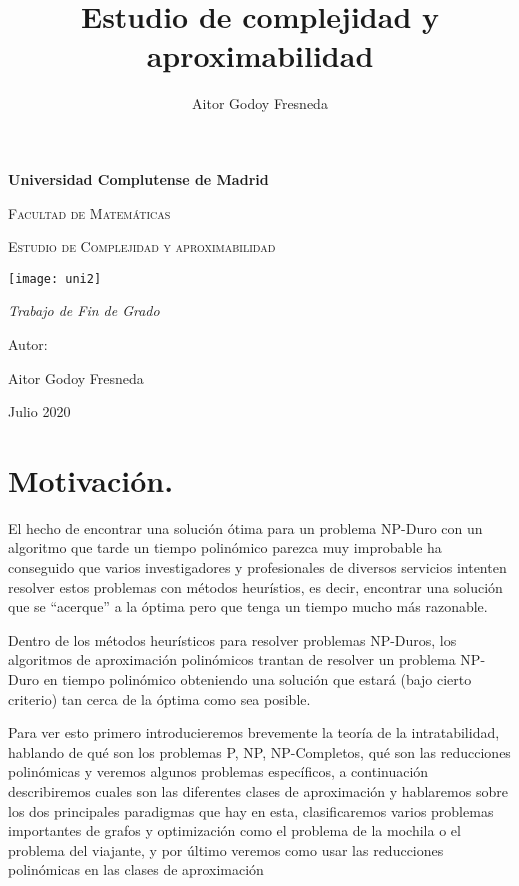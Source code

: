\documentclass[a4paper,12pt,titlepage]{article}
\title{Estudio de complejidad y aproximabilidad}
\author{Aitor Godoy Fresneda}
\begin{document}
\begin{titlepage}
  \centering
  {\bfseries\LARGE Universidad Complutense de Madrid \par}
  \vspace{1cm}
  {\scshape\Large Facultad de Matemáticas \par}
  \vspace{2cm}
  {\scshape\Huge Estudio de Complejidad y aproximabilidad \par}
  \vspace{2cm}
  {\texttt{[image: uni2]}\par}
  \vspace{1cm}
  {\itshape\Large Trabajo de Fin de Grado \par}
  \vfill
  {\Large Autor: \par}
  {\Large Aitor Godoy Fresneda \par}
  \vfill
  {\Large Julio 2020 \par}
\end{titlepage}

\tableofcontents

\newpage

\section{Motivaci\'on.}

El hecho de encontrar una soluci\'on \'otima para un problema NP-Duro con un algoritmo que tarde un tiempo polin\'omico parezca muy improbable ha conseguido que varios investigadores y profesionales de diversos servicios intenten resolver estos problemas con m\'etodos heur\'istios, es decir, encontrar una soluci\'on que se ``acerque'' a la \'optima pero que tenga un tiempo mucho m\'as razonable.

Dentro de los m\'etodos heur\'isticos para resolver problemas NP-Duros, los algoritmos de aproximaci\'on polin\'omicos trantan de resolver un problema NP-Duro en tiempo polin\'omico obteniendo una soluci\'on que estar\'a (bajo cierto criterio) tan cerca de la \'optima como sea posible.

Para ver esto primero introducieremos brevemente la teor\'ia de la intratabilidad, hablando de qu\'e son los problemas P, NP, NP-Completos, qu\'e son las reducciones polin\'omicas y veremos algunos problemas espec\'ificos, a continuaci\'on describiremos cuales son las diferentes clases de aproximaci\'on y hablaremos sobre los dos principales paradigmas que hay en esta, clasificaremos varios problemas importantes de grafos y optimizaci\'on como el problema de la mochila o el problema del viajante, y por \'ultimo veremos como usar las reducciones polin\'omicas en las clases de aproximaci\'on \cite{approx_core} 
\end{document}
